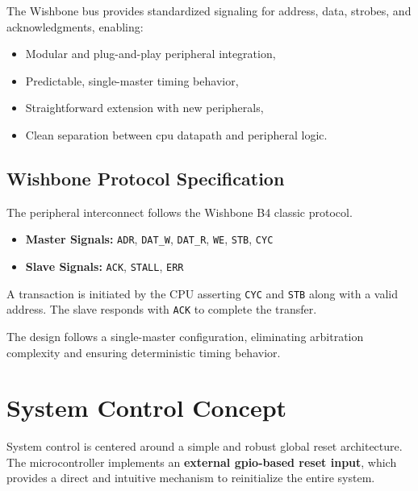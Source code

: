 \begin{enumerate}
            The Wishbone bus provides standardized signaling for address, data, strobes,
            and acknowledgments, enabling:
            \begin{itemize}
                  \item Modular and plug-and-play peripheral integration,
                  \item Predictable, single-master timing behavior,
                  \item Straightforward extension with new peripherals,
                  \item Clean separation between \gls{cpu} datapath and peripheral logic.
            \end{itemize}
\end{enumerate}

\subsection{Wishbone Protocol Specification}

The peripheral interconnect follows the Wishbone B4 classic protocol. 

\begin{itemize}
    \item \textbf{Master Signals:}
          \texttt{ADR}, \texttt{DAT\_W}, \texttt{DAT\_R}, \texttt{WE}, \texttt{STB}, \texttt{CYC}
    \item \textbf{Slave Signals:}
          \texttt{ACK}, \texttt{STALL}, \texttt{ERR}
\end{itemize}

A transaction is initiated by the CPU asserting \texttt{CYC} and \texttt{STB}
along with a valid address. The slave responds with \texttt{ACK} to complete
the transfer.

The design follows a single-master configuration, eliminating arbitration
complexity and ensuring deterministic timing behavior.


\section{System Control Concept}
System control is centered around a simple and robust global reset
architecture. The microcontroller implements an \textbf{external
      \gls{gpio}-based reset input}, which provides a direct and intuitive mechanism
to reinitialize the entire system.

